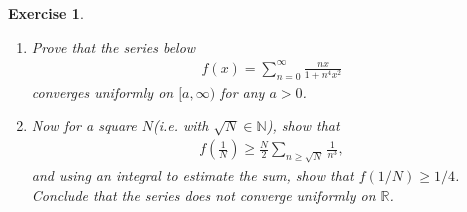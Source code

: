 \documentclass[11pt]{article}
\newtheorem{exercise}{Exercise}[section]
\theoremstyle{definition}
\numberwithin{equation}{subsection}
\begin{document}
\begin{exercise}
~\begin{enumerate}[label=(\alph*)]
    \item Prove that the series below 
    \begin{align*}
        f(x) = \sum^\infty_{n=0} \frac{nx}{1 + n^4x^2}
    \end{align*}
    converges uniformly on $[a, \infty)$ for any $a > 0$.
    
    \item Now for a square $N$(i.e. with $\sqrt{N} \in \mathbb{N}$), show that 
    \begin{align*}
        f\left(\frac{1}{N}\right) \geq \frac{N}{2} \sum_{n \geq \sqrt{N}} \frac{1}{n^3},
    \end{align*}
    and using an integral to estimate the sum, show that $f\left(1/N\right) \geq 1/4$. Conclude that the series does not converge uniformly on $\mathbb{R}$.
\end{enumerate}
\end{exercise}
\end{document}
